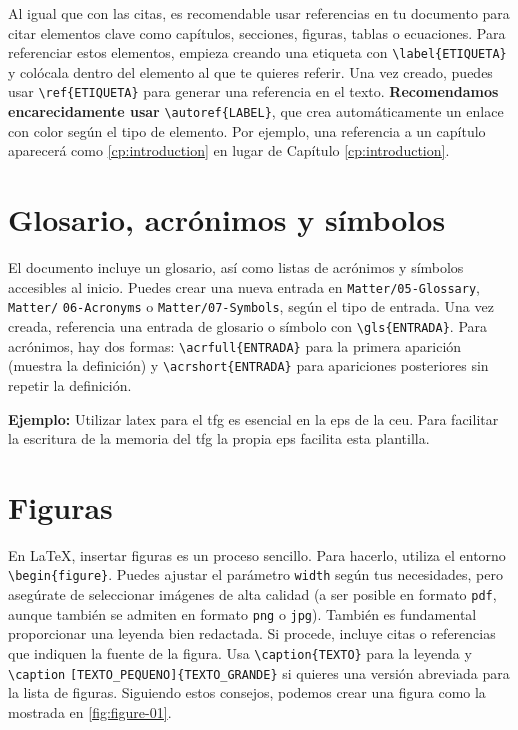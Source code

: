 Al igual que con las citas, es recomendable usar referencias en tu documento para citar elementos clave como capítulos, secciones, figuras, tablas o ecuaciones. Para referenciar estos elementos, empieza creando una etiqueta con \verb|\label{ETIQUETA}| y colócala dentro del elemento al que te quieres referir. Una vez creado, puedes usar \verb|\ref{ETIQUETA}| para generar una referencia en el texto. \textbf{Recomendamos encarecidamente usar} \verb|\autoref{LABEL}|, que crea automáticamente un enlace con color según el tipo de elemento. Por ejemplo, una referencia a un capítulo aparecerá como \autoref{cp:introduction} en lugar de Capítulo \ref{cp:introduction}.

\section{Glosario, acrónimos y símbolos}

El documento incluye un glosario, así como listas de acrónimos y símbolos accesibles al inicio. Puedes crear una nueva entrada en \verb|Matter/05-Glossary|, \verb|Matter/| \verb|06-Acronyms| o \verb|Matter/07-Symbols|, según el tipo de entrada. Una vez creada, referencia una entrada de glosario o símbolo con \verb|\gls{ENTRADA}|. Para acrónimos, hay dos formas: \verb|\acrfull{ENTRADA}| para la primera aparición (muestra la definición) y \verb|\acrshort{ENTRADA}| para apariciones posteriores sin repetir la definición.

\vspace{.875em}
\noindent\textbf{Ejemplo:} Utilizar \Gls{latex} para el \acrfull{tfg} es esencial en la \acrfull{eps} de la \acrfull{ceu}. Para facilitar la escritura de la memoria del \acrshort{tfg} la propia \acrshort{eps} facilita esta plantilla.

\section{Figuras}

En \LaTeX, insertar figuras es un proceso sencillo. Para hacerlo, utiliza el entorno \verb|\begin{figure}|. Puedes ajustar el parámetro \verb|width| según tus necesidades, pero asegúrate de seleccionar imágenes de alta calidad (a ser posible en formato \texttt{pdf}, aunque también se admiten en formato \texttt{png} o \texttt{jpg}). También es fundamental proporcionar una leyenda bien redactada. Si procede, incluye citas o referencias que indiquen la fuente de la figura. Usa \verb|\caption{TEXTO}| para la leyenda y \verb|\caption| \verb|[TEXTO_PEQUENO]{TEXTO_GRANDE}| si quieres una versión abreviada para la lista de figuras. Siguiendo estos consejos, podemos crear una figura como la mostrada en \autoref{fig:figure-01}.

